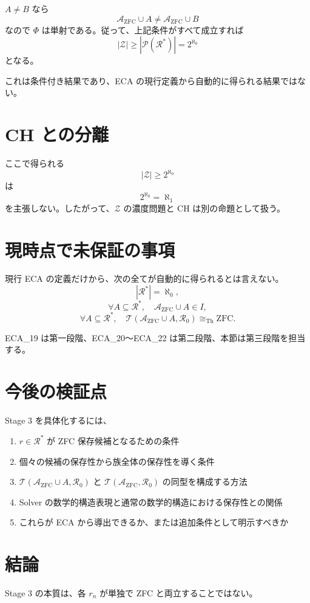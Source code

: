\documentclass[a4paper,11pt]{article}
\begin{document}
\(A\neq B\) なら
\[
\mathcal{A}_{\mathrm{ZFC}}\cup A
\neq
\mathcal{A}_{\mathrm{ZFC}}\cup B
\]
なので \(\Phi\) は単射である。従って、上記条件がすべて成立すれば
\[
\boxed{
|\mathcal{Z}|
\ge
|\mathcal{P}(\mathcal{R}^*)|
=
2^{\aleph_0}
}
\]
となる。

これは条件付き結果であり、ECA の現行定義から自動的に得られる結果ではない。

\section{CH との分離}
ここで得られる
\[
|\mathcal{Z}|\ge2^{\aleph_0}
\]
は
\[
2^{\aleph_0}=\aleph_1
\]
を主張しない。したがって、\(\mathcal{Z}\) の濃度問題と CH は別の命題として扱う。

\section{現時点で未保証の事項}
現行 ECA の定義だけから、次の全てが自動的に得られるとは言えない。
\[
|\mathcal{R}^*|=\aleph_0,
\]
\[
\forall A\subseteq\mathcal{R}^*,
\quad
\mathcal{A}_{\mathrm{ZFC}}\cup A\in I,
\]
\[
\forall A\subseteq\mathcal{R}^*,
\quad
\mathcal{T}(\mathcal{A}_{\mathrm{ZFC}}\cup A,\mathcal{R}_0)
\cong_{\mathrm{Th}}\mathrm{ZFC}.
\]

ECA_19 は第一段階、ECA_20～ECA_22 は第二段階、本節は第三段階を担当する。

\section{今後の検証点}
Stage 3 を具体化するには、
\begin{enumerate}
\item \(r\in\mathcal{R}^*\) が ZFC 保存候補となるための条件
\item 個々の候補の保存性から族全体の保存性を導く条件
\item $\mathcal{T}(\mathcal{A}_{\mathrm{ZFC}}\cup A,\mathcal{R}_0)$ と $\mathcal{T}(\mathcal{A}_{\mathrm{ZFC}},\mathcal{R}_0)$ の同型を構成する方法
\item Solver の数学的構造表現と通常の数学的構造における保存性との関係
\item これらが ECA から導出できるか、または追加条件として明示すべきか
\end{enumerate}

\section{結論}
Stage 3 の本質は、各 \(r_n\) が単独で ZFC と両立することではない。
\end{document}
